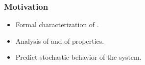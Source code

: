 \begin{frame}
 \frametitle{Motivation}
 
\begin{center}\scalebox{\scaleex}{
\begin{tikzpicture}
\exsandef
\end{tikzpicture}
}\end{center}
 \hspace{5cm}
 \begin{itemize}
  \item Formal characterization of .
  \item Analysis of  and  of properties.
  \item Predict stochastic behavior of the system.   
 \end{itemize}

\end{frame}
